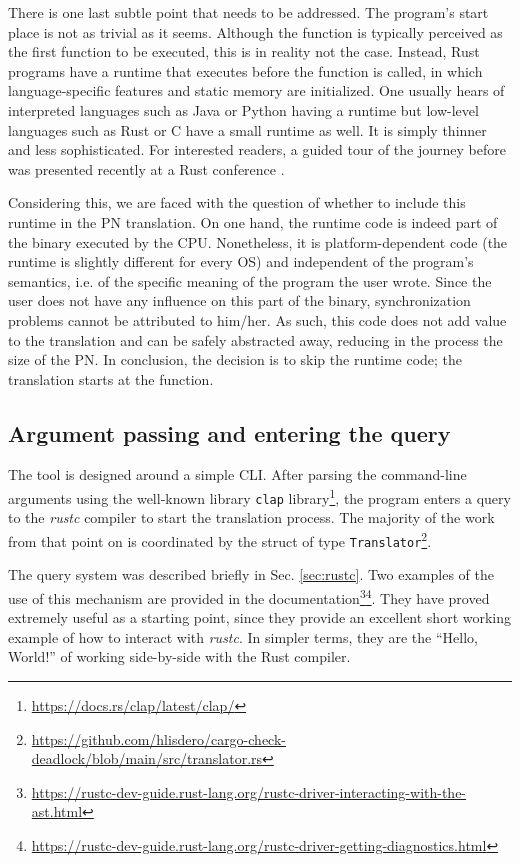 There is one last subtle point that needs to be addressed.
The program's start place is not as trivial as it seems.
Although the  function is typically perceived
as the first function to be executed,
this is in reality not the case.
Instead, Rust programs have a runtime that executes
before the  function is called,
in which language-specific features and static memory are initialized.
One usually hears of interpreted languages such as Java or Python having a runtime
but low-level languages such as Rust or C have a small runtime as well.
It is simply thinner and less sophisticated.
For interested readers, a guided tour of the journey before 
was presented recently at a Rust conference \cite{levick2022}.

Considering this, we are faced with the question of
whether to include this runtime in the \acrshort{PN} translation.
On one hand, the runtime code is indeed part of the binary executed by the \acrshort{CPU}.
Nonetheless, it is platform-dependent code
(the runtime is slightly different for every \acrshort{OS})
and independent of the program's semantics,
i.e. of the specific meaning of the program the user wrote.
Since the user does not have any influence on this part of the binary,
synchronization problems cannot be attributed to him/her.
As such, this code does not add value to the translation
and can be safely abstracted away,
reducing in the process the size of the \acrshort{PN}.
In conclusion, the decision is to skip the runtime code;
the translation starts at the  function.

\subsection{Argument passing and entering the query}

The tool is designed around a simple \acrfull{CLI}.
After parsing the command-line arguments using the well-known
library \texttt{clap} library\footnote{\url{https://docs.rs/clap/latest/clap/}},
the program enters a query to the \emph{rustc} compiler
to start the translation process.
The majority of the work from that point on is coordinated
by the struct of type \texttt{Translator}\footnote{\url{https://github.com/hlisdero/cargo-check-deadlock/blob/main/src/translator.rs}}.

The query system was described briefly in Sec. \ref{sec:rustc}.
Two examples of the use of this mechanism are provided in the
documentation\footnote{\url{https://rustc-dev-guide.rust-lang.org/rustc-driver-interacting-with-the-ast.html}}\footnote{\url{https://rustc-dev-guide.rust-lang.org/rustc-driver-getting-diagnostics.html}}.
They have proved extremely useful as a starting point,
since they provide an excellent short working example of
how to interact with \emph{rustc}.
In simpler terms, they are the ``Hello, World!''
of working side-by-side with the Rust compiler.

